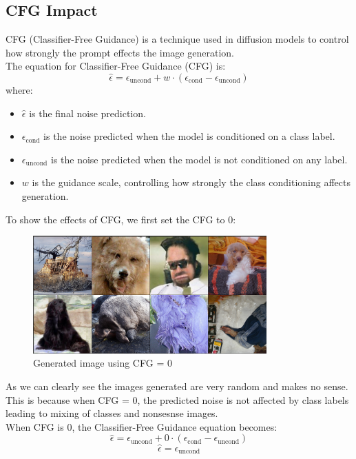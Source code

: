 \documentclass{article}
\begin{document}
\subsection{CFG Impact}

CFG (Classifier-Free Guidance) is a technique used in diffusion models to control how strongly the prompt effects the image generation. 
\\
The equation for Classifier-Free Guidance (CFG) is:
\[
\hat{\epsilon} = \epsilon_{\text{uncond}} + w \cdot (\epsilon_{\text{cond}} - \epsilon_{\text{uncond}})
\]
where:
\begin{itemize}
    \item \( \hat{\epsilon} \) is the final noise prediction.
    \item \( \epsilon_{\text{cond}} \) is the noise predicted when the model is conditioned on a class label.
    \item \( \epsilon_{\text{uncond}} \) is the noise predicted when the model is not conditioned on any label.
    \item \( w \) is the guidance scale, controlling how strongly the class conditioning affects generation.
\end{itemize}
To show the effects of CFG, we first set the CFG to 0:
\\
\begin{figure}[h] %
    \centering
    \includegraphics[width=0.8\textwidth]{images/image2.png} %
    \caption{Generated image using CFG = 0}
    \label{fig:cfg5} %
\end{figure}

As we can clearly see the images generated are very random and makes no sense. This is because when CFG = 0, the predicted noise is not affected by class labels leading to mixing of classes and nonsesnse images.
\\ 
When CFG is 0, the Classifier-Free Guidance equation becomes:
\[
\hat{\epsilon} = \epsilon_{\text{uncond}} + 0 \cdot (\epsilon_{\text{cond}} - \epsilon_{\text{uncond}})
\]
\[
\hat{\epsilon} = \epsilon_{\text{uncond}}
\]
\end{document}
